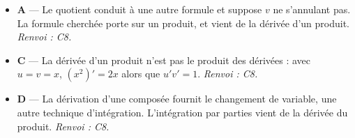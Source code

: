 \begin{itemize}
\begin{itemize}
    \item \textbf{A} — Le quotient conduit à une autre formule et suppose $v$ ne s'annulant pas. La formule cherchée porte sur un produit, et vient de la dérivée d'un produit. \emph{Renvoi : C8.}
    \item \textbf{C} — La dérivée d'un produit n'est pas le produit des dérivées : avec $u=v=x$, $(x^2)'=2x$ alors que $u'v'=1$. \emph{Renvoi : C8.}
    \item \textbf{D} — La dérivation d'une composée fournit le changement de variable, une autre technique d'intégration. L'intégration par parties vient de la dérivée du produit. \emph{Renvoi : C8.}
  \end{itemize}
\end{itemize}
\fi
